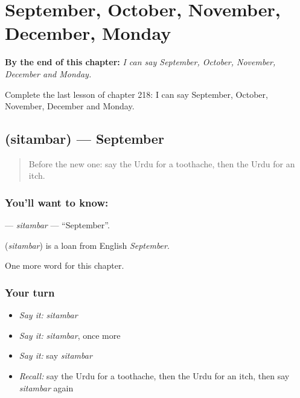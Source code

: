 
\chapter{September, October, November, December, Monday}
\label{ch:ur-september-october-november-december-monday}

\begin{chapteropening}
\textbf{By the end of this chapter:} \emph{I can say September, October, November, December and Monday.}

Complete the last lesson of chapter 218: I can say September, October, November, December and Monday.
\end{chapteropening}

\section[\texorpdfstring{\ur{ستمبر} (sitambar)}{ستمبر (sitambar)}]{ (sitambar) — September}

\label{lesson:UR-C218-sitambar}



\begin{quote}
Before the new one: say the Urdu for a toothache, then the Urdu for an itch.
\end{quote}

\subsection*{You'll want to know: }
\textbf{} — \emph{sitambar} — \textquotedblleft{}September\textquotedblright{}.

\begin{cousinweb}
\textbf{} (\emph{sitambar}) is a loan from English \emph{September}.
\end{cousinweb}

\begin{grammarlens}[title={What you've built}]
One more word for this chapter.
\end{grammarlens}

\subsection*{Your turn}
\begin{itemize}
\raggedright
  \item \emph{Say it:} \emph{sitambar}
  \item \emph{Say it:} \emph{sitambar}, once more
  \item \emph{Say it:} say \emph{sitambar}
  \item \emph{Recall:} say the Urdu for a toothache, then the Urdu for an itch, then say \emph{sitambar} again
\end{itemize}

